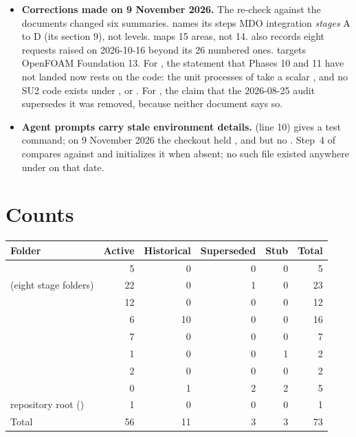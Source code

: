 \begin{itemize}
  \item \textbf{Corrections made on 9 November 2026.} The re-check against the documents changed six summaries.  names its steps MDO integration \emph{stages} A to D (its section 9), not levels.  maps 15 areas, not 14.  also records eight requests raised on 2026-10-16 beyond its 26 numbered ones.  targets OpenFOAM Foundation 13. For , the statement that Phases 10 and 11 have not landed now rests on the code: the unit processes of  take a scalar , and no SU2 code exists under ,  or . For , the claim that the 2026-08-25 audit supersedes it was removed, because neither document says so.
  \item \textbf{Agent prompts carry stale environment details.}  (line 10) gives a  test command; on 9 November 2026 the checkout held ,  and  but no . Step~4 of  compares against  and initializes it when absent; no such file existed anywhere under  on that date.
\end{itemize}

\section{Counts}\label{sec:inv-counts}

{\small
\noindent\begin{tabularx}{\linewidth}{@{}Yrrrrr@{}}
\toprule
Folder & Active & Historical & Superseded & Stub & Total \\
\midrule
{} & 5 & 0 & 0 & 0 & 5 \\
 (eight stage folders) & 22 & 0 & 1 & 0 & 23 \\
 & 12 & 0 & 0 & 0 & 12 \\
 & 6 & 10 & 0 & 0 & 16 \\
 & 7 & 0 & 0 & 0 & 7 \\
 & 1 & 0 & 0 & 1 & 2 \\
 & 2 & 0 & 0 & 0 & 2 \\
 & 0 & 1 & 2 & 2 & 5 \\
repository root () & 1 & 0 & 0 & 0 & 1 \\
\midrule
Total & 56 & 11 & 3 & 3 & 73 \\
\bottomrule
\end{tabularx}}
